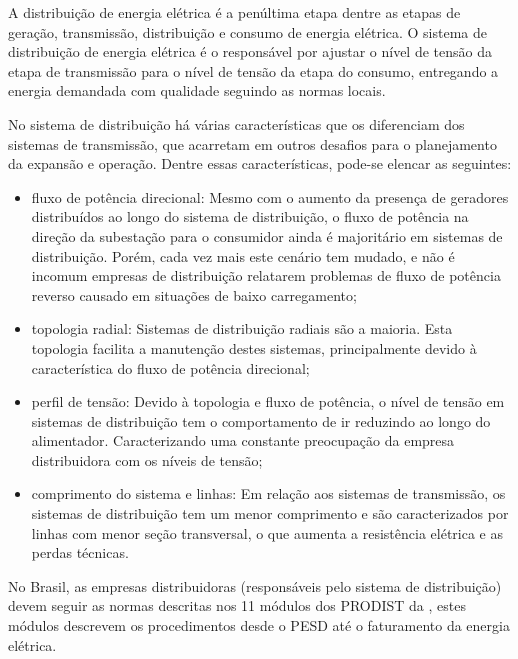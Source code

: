 A distribuição de energia elétrica é a penúltima etapa dentre as etapas de geração, transmissão, distribuição e consumo de energia elétrica. O sistema de distribuição de energia elétrica é o responsável por ajustar o nível de tensão da etapa de transmissão para o nível de tensão da etapa do consumo, entregando a energia demandada com qualidade seguindo as normas locais. 

No sistema de distribuição há várias características que os diferenciam dos sistemas de transmissão, que acarretam em outros desafios para o planejamento da expansão e operação. Dentre essas características, pode-se elencar as seguintes:

\begin{itemize}
    \item fluxo de potência direcional: Mesmo com o aumento da presença de geradores distribuídos ao longo do sistema de distribuição, o fluxo de potência na direção da subestação para o consumidor ainda é majoritário em sistemas de distribuição. Porém, cada vez mais este cenário tem mudado, e não é incomum empresas de distribuição relatarem problemas de fluxo de potência reverso causado em situações de baixo carregamento;
    
    \item topologia radial: Sistemas de distribuição radiais são a maioria. Esta topologia facilita a manutenção destes sistemas, principalmente devido à característica do fluxo de potência direcional;
    
    \item perfil de tensão: Devido à topologia e fluxo de potência, o nível de tensão em sistemas de distribuição tem o comportamento de ir reduzindo ao longo do alimentador. Caracterizando uma constante preocupação da empresa distribuidora com os níveis de tensão;
    
    \item comprimento do sistema e linhas: Em relação aos sistemas de transmissão, os sistemas de distribuição tem um menor comprimento e são caracterizados por linhas com menor seção transversal, o que aumenta a resistência elétrica e as perdas técnicas. 
\end{itemize}

No Brasil, as empresas distribuidoras (responsáveis pelo sistema de distribuição) devem seguir as normas descritas nos 11 módulos dos \ac{PRODIST} da , estes módulos descrevem os procedimentos desde o PESD até o faturamento da energia elétrica.

